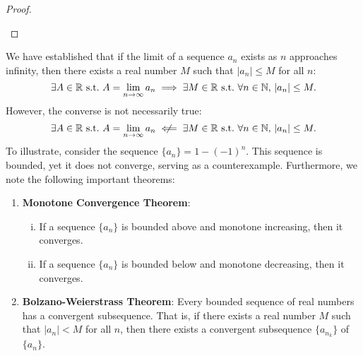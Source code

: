 \documentclass[11pt,openany]{article}
\begin{document}
\newpage
{}
\vspace{20pt}
\begin{proof}
\ \begin{center}
	
\end{center}\vfill
\end{proof}

\newpage
\begin{note}
	We have established that if the limit of a sequence \(a_n\) exists as \(n\) approaches infinity, then there exists a real number \(M\) such that \(\lvert a_n \rvert \leq M\) for all \(n\): \[
	\exists A\in\R\ \text{s.t.}\ A=\lim_{n\to\infty}a_n\implies\exists M\in\R\ \text{s.t.}\ \forall n\in\N,\ \abs{a_n}\leq M.
	\]However, the converse is not necessarily true: \[
	\exists A\in\R\ \text{s.t.}\ A=\lim_{n\to\infty}a_n\centernot\impliedby\exists M\in\R\ \text{s.t.}\ \forall n\in\N,\ \abs{a_n}\leq M.
	\] To illustrate, consider the sequence \(\{a_n\} = 1 - (-1)^n\). This sequence is bounded, yet it does not converge, serving as a counterexample.
\vspace{20pt}
	\noindent Furthermore, we note the following important theorems:
	\begin{enumerate}
		\item \textbf{Monotone Convergence Theorem}:
		\begin{enumerate}[(i)]
			\item If a sequence \(\{a_n\}\) is bounded above and monotone increasing, then it converges.
			\item If a sequence \(\{a_n\}\) is bounded below and monotone decreasing, then it converges.
		\end{enumerate}
		\item \textbf{Bolzano-Weierstrass Theorem}: Every bounded sequence of real numbers has a convergent subsequence. That is, if there exists a real number \(M\) such that \(\lvert a_n \rvert < M\) for all \(n\), then there exists a convergent subsequence \(\{a_{n_k}\}\) of \(\{a_n\}\).
	\end{enumerate}
\end{note}
\end{document}
